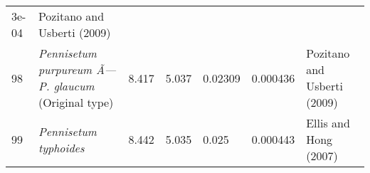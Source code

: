\documentclass[]{article}
\begin{document}
\begin{longtable}[]{@{}lllllll@{}}
\begin{minipage}[t]{0.08\columnwidth}
3e-04\strut
\end{minipage} & \begin{minipage}[t]{0.23\columnwidth}\raggedright
Pozitano and Usberti (2009)\strut
\end{minipage}\tabularnewline
\begin{minipage}[t]{0.05\columnwidth}\raggedright
98\strut
\end{minipage} & \begin{minipage}[t]{0.23\columnwidth}\raggedright
\emph{Pennisetum purpureum Ã--- P. glaucum }(Original type)\strut
\end{minipage} & \begin{minipage}[t]{0.05\columnwidth}\raggedright
8.417\strut
\end{minipage} & \begin{minipage}[t]{0.08\columnwidth}\raggedright
5.037\strut
\end{minipage} & \begin{minipage}[t]{0.08\columnwidth}\raggedright
0.02309\strut
\end{minipage} & \begin{minipage}[t]{0.08\columnwidth}\raggedright
0.000436\strut
\end{minipage} & \begin{minipage}[t]{0.23\columnwidth}\raggedright
Pozitano and Usberti (2009)\strut
\end{minipage}\tabularnewline
\begin{minipage}[t]{0.05\columnwidth}\raggedright
99\strut
\end{minipage} & \begin{minipage}[t]{0.23\columnwidth}\raggedright
\emph{Pennisetum typhoides}\strut
\end{minipage} & \begin{minipage}[t]{0.05\columnwidth}\raggedright
8.442\strut
\end{minipage} & \begin{minipage}[t]{0.08\columnwidth}\raggedright
5.035\strut
\end{minipage} & \begin{minipage}[t]{0.08\columnwidth}\raggedright
0.025\strut
\end{minipage} & \begin{minipage}[t]{0.08\columnwidth}\raggedright
0.000443\strut
\end{minipage} & \begin{minipage}[t]{0.23\columnwidth}\raggedright
Ellis and Hong (2007)\strut
\end{minipage}\tabularnewline

\end{longtable}
\end{document}
